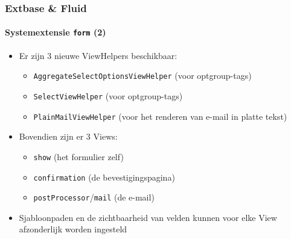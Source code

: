 
\begin{frame}[fragile]
	\frametitle{Extbase \& Fluid}
	\framesubtitle{Systemextensie \texttt{form} (2)}

	\begin{itemize}

		\item Er zijn 3 nieuwe ViewHelpers beschikbaar:

			\begin{itemize}
				\item \texttt{AggregateSelectOptionsViewHelper} (voor optgroup-tags)
				\item \texttt{SelectViewHelper} (voor optgroup-tags)
				\item \texttt{PlainMailViewHelper} (voor het renderen van e-mail in platte tekst)
			\end{itemize}

		\item Bovendien zijn er 3 Views:

			\begin{itemize}
				\item \texttt{show} (het formulier zelf)
				\item \texttt{confirmation} (de bevestigingspagina)
				\item \texttt{postProcessor}/\texttt{mail} (de e-mail)
			\end{itemize}

		\item Sjabloonpaden en de zichtbaarheid van velden kunnen voor elke View afzonderlijk 
			worden ingesteld

	\end{itemize}

\end{frame}


